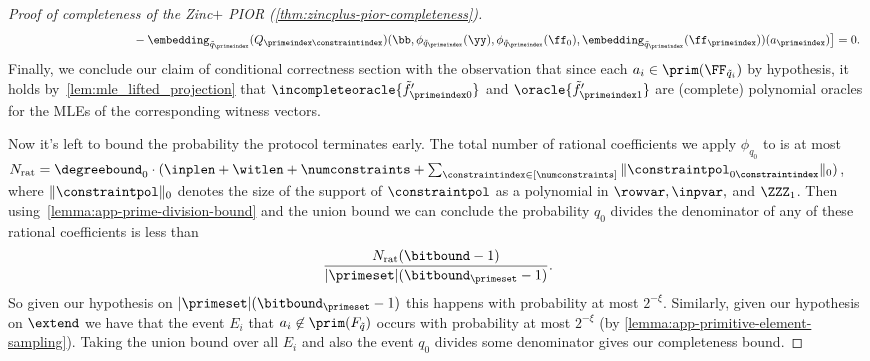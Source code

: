\begin{proof}[Proof of completeness of the Zinc$+$ PIOR (\cref{thm:zincplus-pior-completeness})]
\[\begin{array}{rl}
    &\phantom{of the opera}\qquad\qquad - \embedding_{\tilde{q}_\primeindex}(Q_{\primeindex\constraintindex})(\bb,\phi_{\tilde{q}_\primeindex}(\yy),\phi_{\tilde{q}_\primeindex}(\ff_0),\embedding_{\tilde{q}_\primeindex}(\ff_\primeindex))(a_\primeindex) \big] = 0.
\end{array}
\]
Finally, we conclude our claim of conditional correctness section with the observation that since each $a_i \in \prim(\FF_{\tilde q_i})$ by hypothesis, it holds by~\cref{lem:mle_lifted_projection} that $\incompleteoracle{\tilde{f}'_{\primeindex0}}$ and $\oracle{\tilde{f}'_{\primeindex1}}$ are (complete) polynomial oracles for the MLEs of the corresponding witness vectors.

Now it's left to bound the probability the protocol terminates early. The total number of rational coefficients we apply $\phi_{q_0}$ to is at most $N_{\mathrm{rat}} = \degreebound_0 \cdot (\inplen + \witlen + \numconstraints + \sum_{\constraintindex \in [\numconstraints]} \|\constraintpol_{0\constraintindex} \|_0)$, where $\|\constraintpol \|_0$ denotes the size of the support of $\constraintpol$ as a polynomial in $\rowvar,\inpvar,$ and $\ZZZ_1$. Then using~\cref{lemma:app-prime-division-bound} and the union bound we can conclude the probability $q_0$ divides the denominator of any of these rational coefficients is less than
\[
\frac{N_{\mathrm{rat}} (\bitbound-1)}{|\primeset|(\bitbound_\primeset-1)}.
\]
So given our hypothesis on $|\primeset|(\bitbound_\primeset - 1)$ this happens with probability at most $2^{-\xi}$. Similarly, given our hypothesis on $\extend$ we have that the event $E_i$ that $a_i \not\in \prim(F_{\tilde{q}})$ occurs with probability at most $2^{-\xi}$ (by \cref{lemma:app-primitive-element-sampling}). Taking the union bound over all $E_i$ and also the event $q_0$ divides some denominator gives our completeness bound.
\end{proof}


